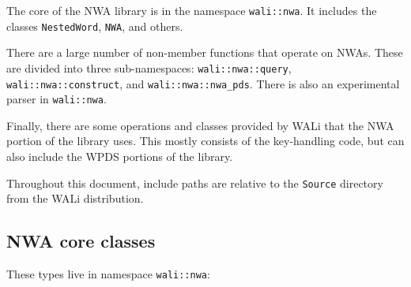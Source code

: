 The core of the NWA library is in the namespace \texttt{wali::nwa}. It
includes the classes \texttt{NestedWord}, \texttt{NWA}, and others.

There are a large number of non-member functions that operate on NWAs. These
are divided into three sub-namespaces:
\texttt{wali::nwa::query}, \texttt{wali::nwa::construct}, and
\texttt{wali::nwa::nwa\_pds}. There is also an experimental parser in
\texttt{wali::nwa}.

Finally, there are some operations and classes provided by WALi that the NWA
portion of the library uses. This mostly consists of the key-handling code,
but can also include the WPDS portions of the library.

Throughout this document, include paths are relative to the \texttt{Source}
directory from the WALi distribution.

\subsection{NWA core classes}

These types live in namespace \texttt{wali::nwa}:

